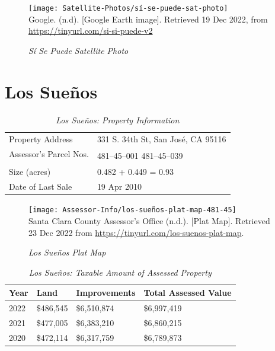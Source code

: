 \begin{figure}[hbt]
  \centering
  \caption[Sí Se Puede Satellite Photo]{\textit{Sí Se Puede Satellite Photo}}\label{fig:sí-se-puede-sat-photo}
  \texttt{[image: Satellite-Photos/sí-se-puede-sat-photo]}\\ %
  \footnotesize
  Google. (n.d). [Google Earth image]. Retrieved 19 Dec 2022, from \url{https://tinyurl.com/si-si-puede-v2} %
\end{figure}


\clearpage
\section{Los Sueños}\label{sec:los-suenos-info}\indent

\begin{table}[htb]
  \SingleSpacing%
  \caption[Los Sueños: Property Information]{\textit{Los Sueños: Property Information}}\label{tab:los-sueños-prop-info}
  \begin{tabular}{ll}
    \toprule
    Property Address       & 331 S. 34th St, San José, CA 95116 \\
    Assessor's Parcel Nos. & \multirow[t]{2}{1in}{481–45–001 481–45–039} \\
    \\
    Size (acres)           & 0.482 + 0.449 = 0.93 \\
    Date of Last Sale      & 19 Apr 2010 \\
    \bottomrule
  \end{tabular}
\end{table}

\begin{figure}[hbt]
  \caption[Los Sueños Plat Map]{\textit{Los Sueños Plat Map}}\label{fig:los-sueños-plat-map}
  \texttt{[image: Assessor-Info/los-sueños-plat-map-481-45]}\\ %
  \footnotesize{Santa Clara County Assessor's Office (n.d.). [Plat Map]. Retrieved 23 Dec 2022 from  \url{https://tinyurl.com/los-suenos-plat-map}}.
\end{figure}

\begin{table}[hbt]
  \SingleSpacing%
  \caption[Los Sueños: Taxable Amount of Assessed Propery]{\textit{Los Sueños: Taxable Amount of Assessed Property}}\label{tab:los-sueños-taxable-amount}
  \begin{tabular}{llll}
    \toprule
    Year & Land      & Improvements & Total Assessed Value \\
    \midrule
    2022 & \$486,545 & \$6,510,874  & \$6,997,419 \\
    2021 & \$477,005 & \$6,383,210  & \$6,860,215 \\
    2020 & \$472,114 & \$6,317,759  & \$6,789,873 \\
    \bottomrule
  \end{tabular}
\end{table}

